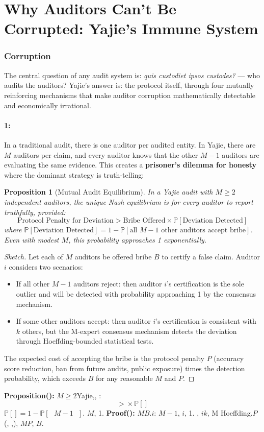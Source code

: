 \documentclass[12pt,a4paper]{article}
\newtheorem{proposition}[theorem]{Proposition}
\theoremstyle{remark}
\newcommand{\Pbb}{\mathbb{P}}
\begin{document}
\part{Why Auditors Can't Be Corrupted: Yajie's Immune System}
\section{Corruption}
The central question of any audit system is: \textit{quis custodiet ipsos custodes?} --- 
who audits the auditors? Yajie's answer is: the protocol itself, through four mutually 
reinforcing mechanisms that make auditor corruption mathematically detectable and 
economically irrational.
\subsection{1:}
In a traditional audit, there is one auditor per audited entity. In Yajie, there are 
$M$ auditors per claim, and every auditor knows that the other $M-1$ auditors are 
evaluating the same evidence. This creates a \textbf{prisoner's dilemma for honesty} 
where the dominant strategy is truth-telling:
\begin{proposition}[Mutual Audit Equilibrium]
In a Yajie audit with $M \geq 2$ independent auditors, the unique Nash equilibrium is 
for every auditor to report truthfully, provided:
\begin{equation}
 \text{Protocol Penalty for Deviation} > \text{Bribe Offered} \times \Pbb[\text{Deviation Detected}]
\end{equation}
where $\Pbb[\text{Deviation Detected}] = 1 - \Pbb[\text{all } M-1 \text{ other auditors accept bribe}]$.
Even with modest $M$, this probability approaches 1 exponentially.
\end{proposition}
\begin{proof}[Sketch]
Let each of $M$ auditors be offered bribe $B$ to certify a false claim. Auditor $i$ 
considers two scenarios:
\begin{itemize}
 \item If all other $M-1$ auditors reject: then auditor $i$'s certification is the 
 sole outlier and will be detected with probability approaching 1 by the consensus 
 mechanism.
 \item If some other auditors accept: then auditor $i$'s certification is consistent 
 with $k$ others, but the M-expert consensus mechanism detects the deviation 
 through Hoeffding-bounded statistical tests.
\end{itemize}
The expected cost of accepting the bribe is the protocol penalty $P$ (accuracy score 
reduction, ban from future audits, public exposure) times the detection probability, 
which exceeds $B$ for any reasonable $M$ and $P$.
\end{proof}
\medskip
\textbf{Proposition(): }
$M \geq 2$Yajie,, : 
\begin{equation}
 \text{} > \text{} \times \Pbb[\text{}]
\end{equation}
$\Pbb[\text{}] = 1 - \Pbb[\text{ } M-1 \text{ }]$.
$M$, 1.
\textbf{Proof(): }
$M$$B$.$i$: 
$M-1$, $i$, 1.
, $i$$k$, M
Hoeffding.$P$(, 
,), $M$$P$, $B$.
\end{document}
